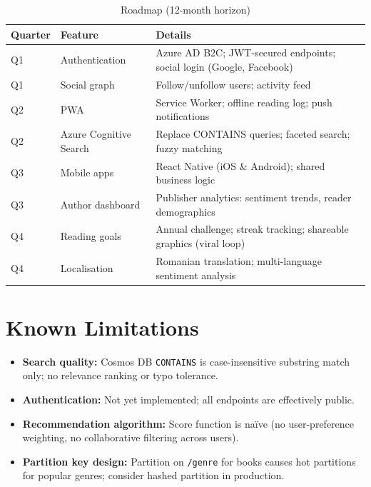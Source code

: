 \documentclass[12pt, a4paper]{report}
\begin{document}
\begin{table}[H]
  \centering
  \caption{Roadmap (12-month horizon)}
  \begin{tabularx}{\textwidth}{C{1.5cm} L{3.5cm} X}
    \toprule
    \textbf{Quarter} & \textbf{Feature} & \textbf{Details} \\
    \midrule
    Q1 & Authentication & Azure AD B2C; JWT-secured endpoints; social login (Google, Facebook) \\
    Q1 & Social graph   & Follow/unfollow users; activity feed \\
    Q2 & PWA            & Service Worker; offline reading log; push notifications \\
    Q2 & Azure Cognitive Search & Replace CONTAINS queries; faceted search; fuzzy matching \\
    Q3 & Mobile apps    & React Native (iOS \& Android); shared business logic \\
    Q3 & Author dashboard & Publisher analytics: sentiment trends, reader demographics \\
    Q4 & Reading goals  & Annual challenge; streak tracking; shareable graphics (viral loop) \\
    Q4 & Localisation   & Romanian translation; multi-language sentiment analysis \\
    \bottomrule
  \end{tabularx}
\end{table}

\section{Known Limitations}

\begin{itemize}[nosep]
  \item \textbf{Search quality:} Cosmos DB \texttt{CONTAINS} is case-insensitive substring
    match only; no relevance ranking or typo tolerance.
  \item \textbf{Authentication:} Not yet implemented; all endpoints are effectively public.
  \item \textbf{Recommendation algorithm:} Score function is naïve (no user-preference
    weighting, no collaborative filtering across users).
  \item \textbf{Partition key design:} Partition on \texttt{/genre} for books causes
    hot partitions for popular genres; consider hashed partition in production.
\end{itemize}
\end{document}
